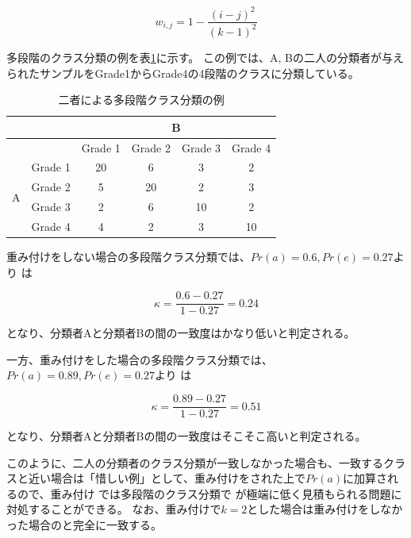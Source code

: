 \documentclass[12pt]{jarticle}
\begin{document}
\begin{equation}
w_{i, j} = 1 - \frac{(i - j)^2}{(k-1)^2}
\end{equation}

多段階のクラス分類の例を表\ref{classifi_4}に示す。
この例では、A, Bの二人の分類者が与えられたサンプルをGrade1からGrade4の4段階のクラスに分類している。

\begin{table}
\begin{center}
\caption{二者による多段階クラス分類の例}
\label{classifi_4}
\begin{tabular}[t]{|c|c|c|c|c|c|}
  \hline
  \multirow{2}{*}{} & & \multicolumn{4}{|c|}{B} \\ \hline
                            &   & Grade 1 & Grade 2 & Grade 3 & Grade 4 \\ \hline
  \multirow{4}{*}{A} & Grade 1  & 20 &  6 &  3 &  2   \\ \cline{2-6}
                     & Grade 2  &  5 & 20 &  2 &  3   \\ \cline{2-6}
                     & Grade 3  &  2 &  6 & 10 &  2   \\ \cline{2-6}
                     & Grade 4  &  4 &  2 &  3 &  10   \\ \hline
\end{tabular}
\end{center}
\end{table}

重み付けをしない場合の多段階クラス分類では、$Pr(a) = 0.6, Pr(e) = 0.27$より \kappac は

\begin{equation}
  \kappa = \frac{0.6 - 0.27}{1 - 0.27} = 0.24
\end{equation}

となり、分類者Aと分類者Bの間の一致度はかなり低いと判定される。

一方、重み付けをした場合の多段階クラス分類では、$Pr(a) = 0.89, Pr(e) = 0.27$より \kappac は

\begin{equation}
  \kappa = \frac{0.89 - 0.27}{1 - 0.27} = 0.51
\end{equation}

となり、分類者Aと分類者Bの間の一致度はそこそこ高いと判定される。

このように、二人の分類者のクラス分類が一致しなかった場合も、一致するクラスと近い場合は「惜しい例」として、重み付けをされた上で$Pr(a)$に加算されるので、重み付け \kappac では多段階のクラス分類で \kappac が極端に低く見積もられる問題に対処することができる。
なお、重み付け\kappac で$k=2$とした場合は重み付けをしなかった場合の\kappac と完全に一致する。
\end{document}
